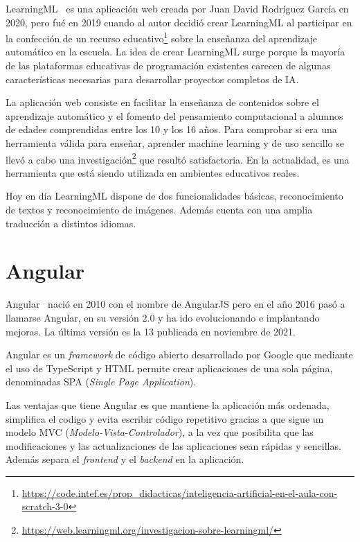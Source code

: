 \documentclass[a4paper, 12pt]{book}
\begin{document}
LearningML~\cite{Pagina_de_LearningML} es una aplicación web creada por Juan David Rodríguez García en 2020, pero fué en 2019 cuando al autor decidió crear LearningML al participar en la confección de un recurso educativo\footnote{\url{https://code.intef.es/prop_didacticas/inteligencia-artificial-en-el-aula-con-scratch-3-0}}  sobre la enseñanza del aprendizaje automático en la escuela. 
La idea de crear LearningML surge porque la mayoría de las plataformas educativas de programación existentes carecen de algunas características necesarias para desarrollar proyectos completos de IA.

La aplicación web consiste en facilitar la enseñanza de contenidos sobre el aprendizaje automático y el fomento del pensamiento computacional a alumnos de edades comprendidas entre los 10 y los 16 años. 
Para comprobar si era una herramienta válida para enseñar, aprender machine learning y de uso sencillo se llevó a cabo una investigación\footnote{\url{https://web.learningml.org/investigacion-sobre-learningml/}} que resultó satisfactoria. 
En la actualidad, es una herramienta que está siendo utilizada en ambientes educativos reales.

Hoy en día LearningML dispone de dos funcionalidades básicas, reconocimiento de textos y reconocimiento de imágenes. 
Además cuenta con una amplia traducción a distintos idiomas.

\section{Angular} 
\label{sec:Angular}

Angular~\cite{Pagina_de_angular, Curso_de_angular} nació en 2010 con el nombre de AngularJS pero en el año 2016 pasó a llamarse Angular, en su versión 2.0 y ha ido evolucionando e implantando mejoras. 
La última versión es la 13 publicada en noviembre de 2021.

Angular es un \emph{framework} de código abierto desarrollado por Google que mediante el uso de TypeScript y HTML permite crear aplicaciones de una sola página, denominadas SPA (\emph{Single Page Application}).

Las ventajas que tiene Angular es que mantiene la aplicación más ordenada, simplifica el codigo y evita escribir código repetitivo gracias a que sigue un modelo MVC (\emph{Modelo-Vista-Controlador}), a la vez que posibilita que las modificaciones y las actualizaciones de las aplicaciones sean rápidas y sencillas. 
Además separa el \emph{frontend} y el \emph{backend} en la aplicación.
\end{document}
